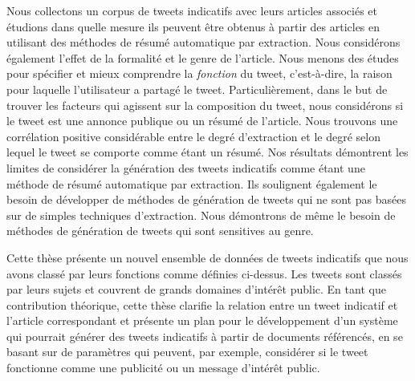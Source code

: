\documentclass[doublespaced, 12pt]{ut-thesis}
\begin{document}
\begin{preliminary}
\begin{frenchabstract}
Nous collectons un corpus de tweets indicatifs avec leurs articles associ\'{e}s et \'{e}tudions dans quelle mesure ils peuvent être obtenus \`{a} partir des articles en utilisant des m\'{e}thodes de r\'{e}sum\'{e} automatique par extraction. Nous consid\'{e}rons \'{e}galement l'effet de la formalit\'{e} et le genre de l'article. Nous menons des \'{e}tudes pour sp\'{e}cifier et mieux comprendre la \textit{fonction} du tweet, c'est-\`{a}-dire, la raison pour laquelle l'utilisateur a partag\'{e} le tweet. Particuli\`{e}rement, dans le but de trouver les facteurs qui agissent sur la composition du tweet, nous consid\'{e}rons si le tweet est une annonce publique ou un r\'{e}sum\'{e} de l'article. Nous trouvons une corr\'{e}lation positive consid\'{e}rable entre le degr\'{e} d'extraction et le degr\'{e} selon lequel le tweet se comporte comme \'{e}tant un r\'{e}sum\'{e}. Nos r\'{e}sultats d\'{e}montrent les limites de consid\'{e}rer la g\'{e}n\'{e}ration des tweets indicatifs comme \'{e}tant une m\'{e}thode de r\'{e}sum\'{e} automatique par extraction. Ils soulignent \'{e}galement le besoin de d\'{e}velopper de m\'{e}thodes de g\'{e}n\'{e}ration de tweets qui ne sont pas bas\'{e}es sur de simples techniques d'extraction. Nous d\'{e}montrons de m\^{e}me le besoin de m\'{e}thodes de g\'{e}n\'{e}ration de tweets qui sont sensitives au genre.

Cette th\`{e}se pr\'{e}sente un nouvel ensemble de donn\'{e}es de tweets indicatifs que nous avons class\'{e} par leurs fonctions comme d\'{e}finies ci-dessus. Les tweets sont class\'{e}s par leurs sujets et couvrent de grands domaines d'int\'{e}r\^{e}t public. En tant que contribution th\'{e}orique, cette th\`{e}se clarifie la relation entre un tweet indicatif et l'article correspondant et pr\'{e}sente un plan pour le d\'{e}veloppement d'un syst\`{e}me qui pourrait g\'{e}n\'{e}rer des tweets indicatifs \`{a} partir de documents r\'{e}f\'{e}renc\'{e}s, en se basant sur de param\`{e}tres qui peuvent, par exemple, consid\'{e}rer si le tweet fonctionne comme une publicit\'{e} ou un message d'int\'{e}r\^{e}t public.


\end{frenchabstract}





\end{preliminary}
\end{document}
